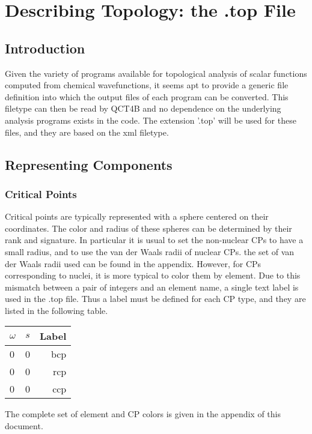 \documentclass{report}
\begin{document}
\chapter{Describing Topology: the .top File}

\section{Introduction}

Given the variety of programs available for topological analysis of scalar functions computed from chemical wavefunctions,
it seems apt to provide a generic file definition into which the output files of each program can be converted.
This filetype can then be read by QCT4B and no dependence on the underlying analysis programs exists in the code.
The extension '.top' will be used for these files, and they are based on the xml filetype.

\section{Representing Components}

\subsection{Critical Points}
Critical points are typically represented with a sphere centered on their coordinates.
The color and radius of these spheres can be determined by their rank and signature.
In particular it is usual to set the non-nuclear CPs to have a small radius, and to use the van der Waals radii of nuclear CPs.
the set of van der Waals radii used can be found in the appendix.
However, for CPs corresponding to nuclei, it is more typical to color them by element.
Due to this mismatch between a pair of integers and an element name, a single text label is used in the .top file.
Thus a label must be defined for each CP type, and they are listed in the following table.

\begin{tabular}{ l c || r }
$\omega$ & $s$ & Label \\
\hline
0 & 0 & bcp \\
0 & 0 & rcp \\
0 & 0 & ccp \\
\end{tabular}

The complete set of element and CP colors is given in the appendix of this document.
\end{document}
